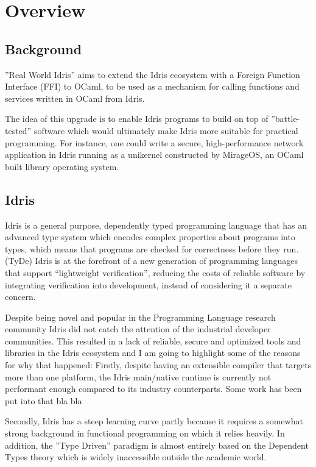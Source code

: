 \documentclass[a4paper]{report}
\begin{document}
\section{Overview}

\subsection{Background}
''Real World Idris'' aims to extend the Idris ecosystem with a Foreign
Function Interface (FFI) to OCaml, to be used as a mechanism for calling
functions and services written in OCaml from Idris.

The idea of this upgrade is to enable Idris programs to build on top of
''battle-tested'' software which would ultimately make Idris more suitable
for practical programming. For instance, one could write a secure,
high-performance network application in Idris running as a unikernel
constructed by MirageOS, an OCaml built library operating system.

\subsection{Idris}
Idris is a general purpose, dependently typed programming language that has an
advanced type system which encodes complex properties about programs into
types, which means that programs are checked for correctness before they run.
(TyDe)
Idris is at the forefront of a new generation of programming languages
that support “lightweight verification”, reducing the costs of reliable
software by integrating verification into development, instead of considering
it a separate concern.

Despite being novel and popular in the Programming Language research community
Idris did not catch the attention of the industrial developer communities.
This resulted in a lack of reliable, secure and optimized tools and libraries
in the Idris ecosystem and I am going to highlight some of the reasons for
why that happened:
Firstly, despite having an extensible compiler that targets more than one
platform, the Idris main/native runtime is currently not performant enough
compared to its industry counterparts.
Some work has been put into that bla bla

Secondly, Idris has a steep learning curve partly because it requires
a somewhat strong background in functional programming on which it relies
heavily.
In addition, the ''Type Driven'' paradigm is almost entirely based on the
Dependent Types theory which is widely inaccessible outside the academic world.
\end{document}
